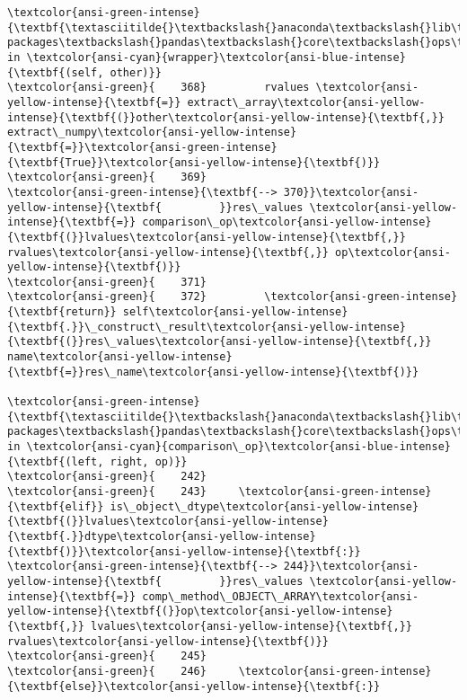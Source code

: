 \documentclass[11pt]{article}
\begin{document}
\begin{Verbatim}[commandchars=\\\{\}, frame=single, framerule=2mm, rulecolor=\color{outerrorbackground}]
\textcolor{ansi-green-intense}{\textbf{\textasciitilde{}\textbackslash{}anaconda\textbackslash{}lib\textbackslash{}site-packages\textbackslash{}pandas\textbackslash{}core\textbackslash{}ops\textbackslash{}\_\_init\_\_.py}} in \textcolor{ansi-cyan}{wrapper}\textcolor{ansi-blue-intense}{\textbf{(self, other)}}
\textcolor{ansi-green}{    368}         rvalues \textcolor{ansi-yellow-intense}{\textbf{=}} extract\_array\textcolor{ansi-yellow-intense}{\textbf{(}}other\textcolor{ansi-yellow-intense}{\textbf{,}} extract\_numpy\textcolor{ansi-yellow-intense}{\textbf{=}}\textcolor{ansi-green-intense}{\textbf{True}}\textcolor{ansi-yellow-intense}{\textbf{)}}
\textcolor{ansi-green}{    369} 
\textcolor{ansi-green-intense}{\textbf{--> 370}}\textcolor{ansi-yellow-intense}{\textbf{         }}res\_values \textcolor{ansi-yellow-intense}{\textbf{=}} comparison\_op\textcolor{ansi-yellow-intense}{\textbf{(}}lvalues\textcolor{ansi-yellow-intense}{\textbf{,}} rvalues\textcolor{ansi-yellow-intense}{\textbf{,}} op\textcolor{ansi-yellow-intense}{\textbf{)}}
\textcolor{ansi-green}{    371} 
\textcolor{ansi-green}{    372}         \textcolor{ansi-green-intense}{\textbf{return}} self\textcolor{ansi-yellow-intense}{\textbf{.}}\_construct\_result\textcolor{ansi-yellow-intense}{\textbf{(}}res\_values\textcolor{ansi-yellow-intense}{\textbf{,}} name\textcolor{ansi-yellow-intense}{\textbf{=}}res\_name\textcolor{ansi-yellow-intense}{\textbf{)}}

\textcolor{ansi-green-intense}{\textbf{\textasciitilde{}\textbackslash{}anaconda\textbackslash{}lib\textbackslash{}site-packages\textbackslash{}pandas\textbackslash{}core\textbackslash{}ops\textbackslash{}array\_ops.py}} in \textcolor{ansi-cyan}{comparison\_op}\textcolor{ansi-blue-intense}{\textbf{(left, right, op)}}
\textcolor{ansi-green}{    242} 
\textcolor{ansi-green}{    243}     \textcolor{ansi-green-intense}{\textbf{elif}} is\_object\_dtype\textcolor{ansi-yellow-intense}{\textbf{(}}lvalues\textcolor{ansi-yellow-intense}{\textbf{.}}dtype\textcolor{ansi-yellow-intense}{\textbf{)}}\textcolor{ansi-yellow-intense}{\textbf{:}}
\textcolor{ansi-green-intense}{\textbf{--> 244}}\textcolor{ansi-yellow-intense}{\textbf{         }}res\_values \textcolor{ansi-yellow-intense}{\textbf{=}} comp\_method\_OBJECT\_ARRAY\textcolor{ansi-yellow-intense}{\textbf{(}}op\textcolor{ansi-yellow-intense}{\textbf{,}} lvalues\textcolor{ansi-yellow-intense}{\textbf{,}} rvalues\textcolor{ansi-yellow-intense}{\textbf{)}}
\textcolor{ansi-green}{    245} 
\textcolor{ansi-green}{    246}     \textcolor{ansi-green-intense}{\textbf{else}}\textcolor{ansi-yellow-intense}{\textbf{:}}


\end{Verbatim}
\end{document}
